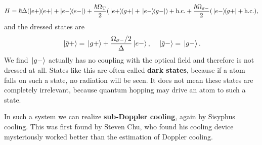 \documentclass[hyperref, a4paper]{article}
\newcommand*{\concept}[1]{{\textbf{#1}}}
\begin{document}
\begin{equation}
    H = \hbar \Delta (\dyad{e+} + \dyad{e-}) 
    + \frac{\hbar \Omega_\text{T}}{2} (\dyad*{e+}{g+} + \dyad*{e-}{g-}) + \text{h.c.}
    + \frac{\hbar \Omega_{\sigma-}}{2} (\dyad*{e-}{g+} + \text{h.c.}),
\end{equation}
and the dressed states are 
\begin{equation}
    \ket*{\tilde{g}+} = \ket*{g+} + \frac{\Omega_{\sigma-} / 2}{\Delta} \ket*{e-}, \quad
    \ket*{\tilde{g}-} = \ket*{g-}.
\end{equation} 
We find $\ket*{g-}$ actually has no coupling with the optical field and therefore is not dressed at all.
States like this are often called \concept{dark states}, because if a atom falls on such a state, no radiation
will be seen. It does not mean these states are completely irrelevant, because quantum hopping may drive 
an atom to such a state.

In such a system we can realize \concept{sub-Doppler cooling}, again by Sisyphus cooling. This was first 
found by Steven Chu, who found his cooling device mysteriously worked better than the estimation of Doppler 
cooling.
\end{document}
